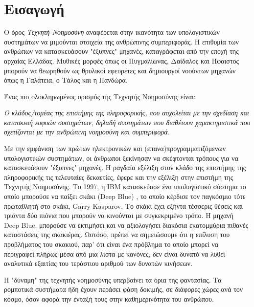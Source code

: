 \chapter{Εισαγωγή}
\label{chapter:intro}

Ο όρος \emph{Τεχνητή Νοημοσύνη} αναφέρεται στην ικανότητα των υπολογιστικών
συστημάτων να μιμούνται στοιχεία της ανθρώπινης συμπεριφοράς.
Η επιθυμία των ανθρώπων να κατασκευάσουν "έξυπνες" μηχανές, καταγράφεται από
την εποχή της αρχαίας Ελλάδας. Μυθικές μορφές όπως οι Πυγμαλίωνας, Δαίδαλος και
Ήφαιστος μπορούν να θεωρηθούν ως θρυλικοί εφευρέτες και δημιουργοί νοούντων
μηχανών όπως η Γαλάτεια, ο Τάλος και η Πανδώρα.

Ένας πιο ολοκληρωμένος ορισμός της Τεχνητής Νοημοσύνης είναι:
\begin{displayquote}
\emph{
  Ο κλάδος/τομέας της επιστήμης της πληροφορικής, που ασχολείται
  με την σχεδίαση και κατασκευή ευφυών συστημάτων, δηλαδή συστημάτων που
  διαθέτουν χαρακτηριστικά που σχετίζονται με την ανθρώπινη νοημοσύνη και συμπεριφορά.
}
\end{displayquote}
Με την εμφάνιση των πρώτων ηλεκτρονικών και (επανα)προγραμματιζόμενων υπολογιστικών συστημάτων,
οι άνθρωποι ξεκίνησαν να σκέφτονται τρόπους για να κατασκευάσουν "έξυπνες" μηχανές.
H ραγδαία εξέλιξη στον κλάδο της επιστήμης της πληροφορικής τις τελευταίες
δεκαετίες, έφερε και την εξέλιξη στην επιστήμη της Τεχνητής Νοημοσύνης.
Το 1997, η IBM κατασκεύασε ένα υπολογιστικό σύστημα το οποίο μπορούσε να
παίξει σκάκι (Deep Blue) \cite{campbell2002deep}, το οποίο κέρδισε τον παγκόσμιο %
τότε πρωταθλητή στο σκάκι, Garry Kasparov. Το σκάκι έχει εξήντα τέσσερις θέσεις
και τριάντα δύο πιόνια που μπορούν να κινούνται με συγκεκριμένο τρόπο. H μηχανή
Deep Blue, μπορούσε να εκτιμήσει και να αξιολογήσει διακόσια εκατομμύρια
πιθανές καταστάσεις της σκακιέρας. Ωστόσο, πρέπει να σημειώσουμε ότι η επίλυση του
προβλήματος του σκακιού, παρ' ότι είναι ένα πρόβλημα το οποίο μπορεί να περιγραφεί
πλήρως μέσα από μια λίστα με κανόνες, δεν είναι δυνατό να λυθεί αναλυτικά εξαιτίας
του τεράστιου αριθμού των δυνατών κινήσεων. 

Η "δύναμη" της τεχνητής νοημοσύνης υπερβαίνει τα όρια της φαντασίας.
Τα ρομποτικά συστήματα ήδη έχουν περάσει φάση δοκιμής, σε διάφορες χώρες ανά τον
κόσμο, όσον αφορά την ένταξή τους στην καθημερινότητα του ανθρώπου.

